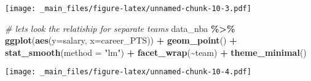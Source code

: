 \documentclass[
]{book}
\newenvironment{Shaded}{\begin{snugshade}}{\end{snugshade}}
\newcommand{\AttributeTok}[1]{\textcolor[rgb]{0.13,0.29,0.53}{#1}}
\newcommand{\CommentTok}[1]{\textcolor[rgb]{0.56,0.35,0.01}{\textit{#1}}}
\newcommand{\FunctionTok}[1]{\textcolor[rgb]{0.13,0.29,0.53}{\textbf{#1}}}
\newcommand{\NormalTok}[1]{#1}
\newcommand{\SpecialCharTok}[1]{\textcolor[rgb]{0.81,0.36,0.00}{\textbf{#1}}}
\newcommand{\StringTok}[1]{\textcolor[rgb]{0.31,0.60,0.02}{#1}}
\begin{document}
\texttt{[image: \_main\_files/figure-latex/unnamed-chunk-10-3.pdf]}

\begin{Shaded}
\begin{Highlighting}[]
\CommentTok{\# let\textquotesingle{}s look the relatiship for separate teams}
\NormalTok{data\_nba }\SpecialCharTok{\%\textgreater{}\%} 
  \FunctionTok{ggplot}\NormalTok{(}\FunctionTok{aes}\NormalTok{(}\AttributeTok{y=}\NormalTok{salary, }\AttributeTok{x=}\NormalTok{career\_PTS)) }\SpecialCharTok{+}
    \FunctionTok{geom\_point}\NormalTok{() }\SpecialCharTok{+} 
     \FunctionTok{stat\_smooth}\NormalTok{(}\AttributeTok{method =} \StringTok{"lm"}\NormalTok{) }\SpecialCharTok{+} 
        \FunctionTok{facet\_wrap}\NormalTok{(}\SpecialCharTok{\textasciitilde{}}\NormalTok{team) }\SpecialCharTok{+} 
       \FunctionTok{theme\_minimal}\NormalTok{()}
\end{Highlighting}
\end{Shaded}

\texttt{[image: \_main\_files/figure-latex/unnamed-chunk-10-4.pdf]}
\end{document}
